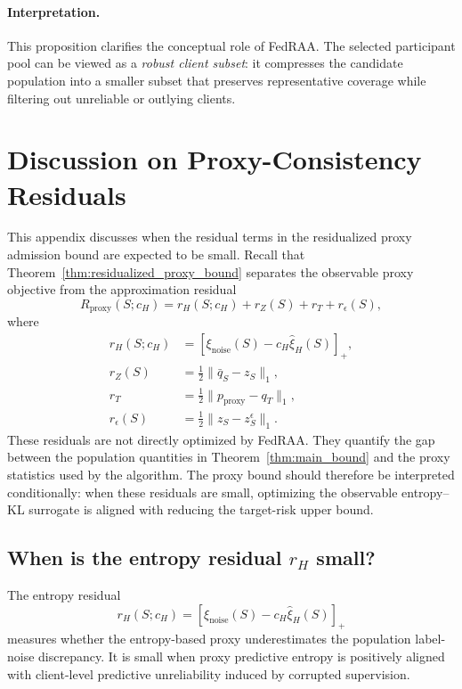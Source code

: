 \documentclass[conference]{IEEEtran}
\theoremstyle{definition}
\theoremstyle{remark}
\begin{document}
\paragraph{Interpretation.}
This proposition clarifies the conceptual role of FedRAA. The selected participant pool can be viewed as a \emph{robust client subset}: it compresses the candidate population into a smaller subset that preserves representative coverage while filtering out unreliable or outlying clients.

\section{Discussion on Proxy-Consistency Residuals}
\label{app:proxy_consistency}

This appendix discusses when the residual terms in the residualized proxy admission bound are expected to be small.
Recall that Theorem~\ref{thm:residualized_proxy_bound} separates the observable proxy objective from the approximation residual
\[
R_{\mathrm{proxy}}(S;c_H)
=
r_H(S;c_H)
+
r_Z(S)
+
r_T
+
r_\epsilon(S),
\]
where
\[
\begin{aligned}
r_H(S;c_H)
&=
\left[
\xi_{\mathrm{noise}}(S)
-
c_H\widehat{\xi}_{H}(S)
\right]_+,
\\
r_Z(S)
&=
\frac12\|\bar q_S-z_S\|_1,
\\
r_T
&=
\frac12\|p_{\mathrm{proxy}}-q_T\|_1,
\\
r_\epsilon(S)
&=
\frac12\|z_S-z_S^\epsilon\|_1.
\end{aligned}
\]
These residuals are not directly optimized by FedRAA.
They quantify the gap between the population quantities in Theorem~\ref{thm:main_bound} and the proxy statistics used by the algorithm.
The proxy bound should therefore be interpreted conditionally: when these residuals are small, optimizing the observable entropy--KL surrogate is aligned with reducing the target-risk upper bound.

\subsection{When is the entropy residual $r_H$ small?}
\label{app:entropy_residual}

The entropy residual
\[
r_H(S;c_H)
=
\left[
\xi_{\mathrm{noise}}(S)
-
c_H\widehat{\xi}_{H}(S)
\right]_+
\]
measures whether the entropy-based proxy underestimates the population label-noise discrepancy.
It is small when proxy predictive entropy is positively aligned with client-level predictive unreliability induced by corrupted supervision.
\end{document}
